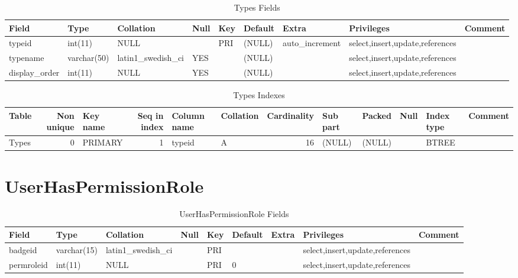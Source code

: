 \documentclass[captions=tablesignature]{scrartcl}
\begin{document}
\begin{table}[htb]
\caption{\label{tbl:typesfields}Types Fields}
\centering
\begin{tabular}{lllllllll}
\hline
Field & Type & Collation & Null & Key & Default & Extra & Privileges & Comment\\
\hline
typeid & int(11) & NULL &  & PRI & (NULL) & auto\_increment & select,insert,update,references & \\
typename & varchar(50) & latin1\_swedish\_ci & YES &  & (NULL) &  & select,insert,update,references & \\
display\_order & int(11) & NULL & YES &  & (NULL) &  & select,insert,update,references & \\
\hline
\end{tabular}
\end{table}

\begin{table}[htb]
\caption{\label{tbl:typesindexes}Types Indexes}
\centering
\begin{tabular}{lrlrllrlllll}
\hline
Table & Non unique & Key name & Seq in index & Column name & Collation & Cardinality & Sub part & Packed & Null & Index type & Comment\\
\hline
Types & 0 & PRIMARY & 1 & typeid & A & 16 & (NULL) & (NULL) &  & BTREE & \\
\hline
\end{tabular}
\end{table}
\section{UserHasPermissionRole}
\label{sec-34}

\begin{table}[htb]
\caption{\label{tbl:userhaspermissionrolefields}UserHasPermissionRole Fields}
\centering
\begin{tabular}{lllllllll}
\hline
Field & Type & Collation & Null & Key & Default & Extra & Privileges & Comment\\
\hline
badgeid & varchar(15) & latin1\_swedish\_ci &  & PRI &  &  & select,insert,update,references & \\
permroleid & int(11) & NULL &  & PRI & 0 &  & select,insert,update,references & \\
\hline
\end{tabular}
\end{table}
\end{document}
